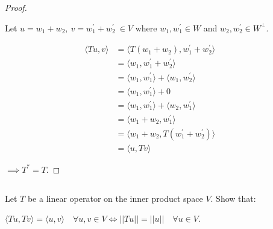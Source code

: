 \documentclass{article}
\newenvironment{customthm}[1]
  {\renewcommand\theinnercustomthm{#1}\innercustomthm}
  {\endinnercustomthm}
\begin{document}
\begin{proof}
  $ $

  Let $u = w_1 + w_2,\ v = w^\prime_1 + w^\prime_2 \ \in V$ where $w_1, w^\prime_1 \in W$ and $w_2, w^\prime_2 \in W^\perp$.

  \begin{align*}
      \langle
        Tu,v
      \rangle 
      &= 
      \langle
        T(w_1 + w_2), w^\prime_1 + w^\prime_2
      \rangle &&\\
      &= 
      \langle
        w_1, w^\prime_1 + w^\prime_2
      \rangle &&\\
      &= 
      \langle
        w_1, w^\prime_1
      \rangle
      +
      \langle
        w_1, w^\prime_2
      \rangle &&\\
      &=
      \langle
        w_1, w^\prime_1
      \rangle
      + 0 &&\\
      &=
      \langle
        w_1, w^\prime_1
      \rangle
      + 
      \langle 
        w_2, w^\prime_1
      \rangle &&\\
      &=
      \langle
        w_1 + w_2, w^\prime_1
      \rangle &&\\
      &= 
      \langle
        w_1 + w_2, T(w^\prime_1 + w^\prime_2)
      \rangle &&\\
      &= 
      \langle
        u, Tv
      \rangle
  \end{align*}

  $\implies T^* = T$.

\end{proof}
\newpage


\begin{customthm}{11}[2023.S(3.C)]
  $ $

  Let $T$ be a linear operator on the inner product space $V$. Show that:

  $\langle
    Tu, Tv
  \rangle 
  =
  \langle
    u, v
  \rangle 
  \quad \forall u,v \in V \iff ||Tu|| = ||u|| \quad \forall u \in V$.
\end{customthm}
\end{document}
